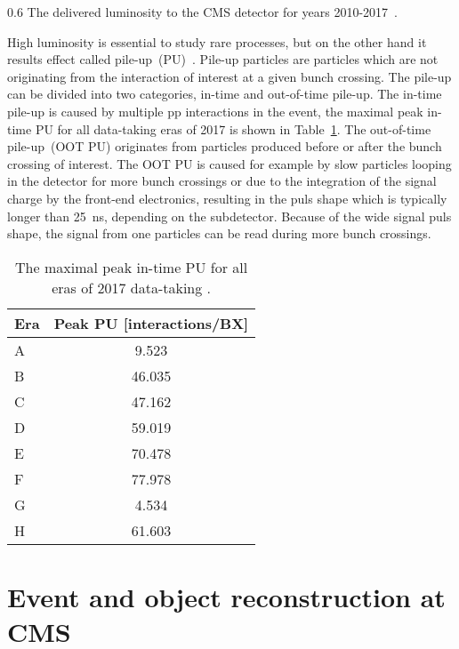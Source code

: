                  {0.6}       %
                 { The delivered luminosity to the CMS detector for years 2010-2017~\cite{website:CMSlumi}. }


High luminosity is essential to study rare processes, but on the other hand it results effect called pile-up~(PU)~\cite{Bayatian:2006nff}. Pile-up particles are particles which are not originating from the interaction of interest at a given bunch crossing. The pile-up can be divided into two categories, in-time and out-of-time pile-up. The in-time pile-up is caused by multiple pp interactions in the event, the maximal peak in-time PU for all data-taking eras of 2017 is shown in Table~\ref{tab:PU}.  The out-of-time pile-up~(OOT PU) originates from particles produced before or after the bunch crossing of interest. The OOT PU is caused for example by slow particles looping in the detector for more bunch crossings or due to the integration of the signal charge by the front-end electronics, resulting in the puls shape which is typically longer than 25~ns, depending on the subdetector. Because of the wide signal puls shape, the signal from one particles can be read during more bunch crossings.

\begin{table}[h]
\begin{center}
\begin{tabular}{|l|c|}
\hline
Era & Peak PU [interactions/BX]  \\
\hline
A & 9.523  \\
B & 46.035  \\
C & 47.162  \\
D & 59.019  \\
E & 70.478  \\
F & 77.978  \\
G & 4.534  \\
H & 61.603  \\
\hline
\end{tabular}
\caption[Table caption text]{The maximal peak in-time PU for all eras of 2017 data-taking . }
\label{tab:PU}
\end{center}
\end{table}
\newpage

\section{Event and object reconstruction at CMS~\label{sec:objects}}

